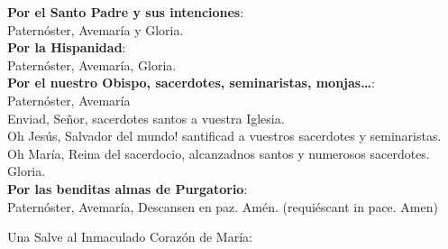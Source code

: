 \documentclass[10pt,a4paper,oneside]{book}
\begin{document}
\textbf{Por el Santo Padre y sus intenciones}:\\
\hspace*{10mm}Paternóster, Avemaría y Gloria.\\
\textbf{Por la Hispanidad}:\\
\hspace*{10mm}Paternóster, Avemaría, Gloria.\\
\textbf{Por el nuestro Obispo, sacerdotes, seminaristas, monjas\ldots}:\\
\hspace*{10mm}Paternóster, Avemaría\\
\hspace*{10mm}Enviad, Señor, sacerdotes santos a vuestra Iglesia.\\
\hspace*{10mm}{!`}Oh Jesús, Salvador del mundo! santificad a vuestros sacerdotes y seminaristas.\\
\hspace*{10mm}Oh María, Reina del sacerdocio, alcanzadnos santos y numerosos sacerdotes.\\
\hspace*{10mm}Gloria.\\
\textbf{Por las benditas almas de Purgatorio}:\\
\hspace*{10mm}Paternóster, Avemaría, Descansen en paz. Amén. (requiéscant in pace. Amen)

\bigskip
{\label{hailMaryQueen}}Una Salve al Inmaculado Corazón de María:\\
\smallskip
\begin{minipage}[t]{0.475\textwidth}
      \\
\end{minipage}
\begin{minipage}[t]{0.475\textwidth}
      \\
\end{minipage}
\end{document}
